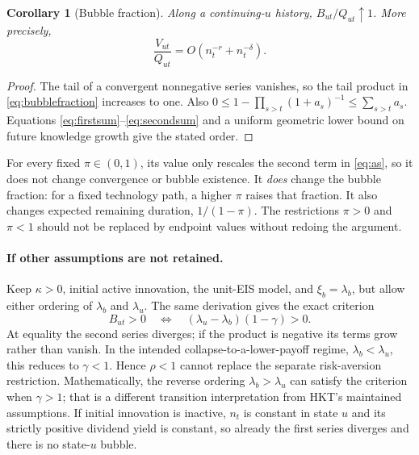 \documentclass[11pt,a4paper]{article}
\newtheorem{corollary}{Corollary}
\begin{document}
\begin{corollary}[Bubble fraction]
Along a continuing-$u$ history, $B_{ut}/Q_{ut}\uparrow1$. More precisely,
\begin{equation}
\frac{V_{ut}}{Q_{ut}}=O\!\left(n_t^{-r}+n_t^{-\delta}\right).
\end{equation}
\end{corollary}
\begin{proof}
The tail of a convergent nonnegative series vanishes, so the tail product in
\eqref{eq:bubblefraction} increases to one. Also
$0\leq1-\prod_{s>t}(1+a_s)^{-1}\leq\sum_{s>t}a_s$.
Equations \eqref{eq:firstsum}--\eqref{eq:secondsum} and a uniform geometric
lower bound on future knowledge growth give the stated order.
\end{proof}
For every fixed $\pi\in(0,1)$, its value only rescales the second term in
\eqref{eq:as}, so it does not change convergence or bubble existence. It
\emph{does} change the bubble fraction: for a fixed technology path, a higher
$\pi$ raises that fraction. It also changes expected remaining duration,
$1/(1-\pi)$. The restrictions $\pi>0$ and $\pi<1$ should not be replaced by
endpoint values without redoing the argument.

\paragraph{If other assumptions are not retained.}
Keep $\kappa>0$, initial active innovation, the unit-EIS model, and
$\xi_b=\lambda_b$, but allow either ordering of $\lambda_b$ and $\lambda_u$.
The same derivation gives the exact criterion
\begin{equation}
\boxed{B_{ut}>0\quad\Longleftrightarrow\quad
(\lambda_u-\lambda_b)(1-\gamma)>0.}\label{eq:generalcriterion}
\end{equation}
At equality the second series diverges; if the product is negative its terms
grow rather than vanish. In the intended collapse-to-a-lower-payoff regime,
$\lambda_b<\lambda_u$, this reduces to $\gamma<1$. Hence $\rho<1$ cannot
replace the separate risk-aversion restriction. Mathematically, the reverse
ordering $\lambda_b>\lambda_u$ can satisfy the criterion when $\gamma>1$;
that is a different transition interpretation from HKT's maintained assumptions.
If initial innovation is inactive, $n_t$ is constant in state $u$ and its
strictly positive dividend yield is constant, so already the first series
diverges and there is no state-$u$ bubble.
\end{document}
